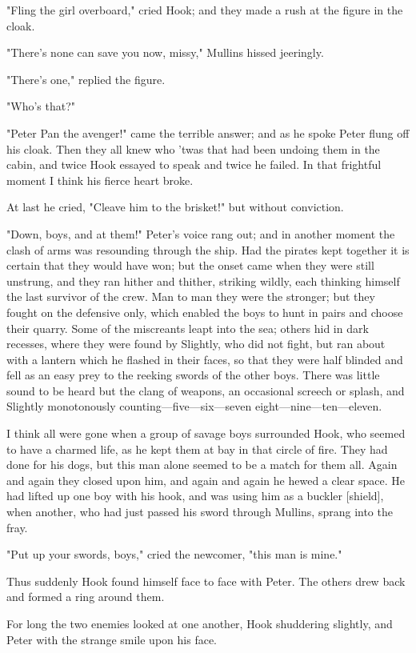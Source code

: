 "Fling the girl overboard," cried Hook; and they made a rush at the figure
in the cloak.


"There's none can save you now, missy," Mullins hissed jeeringly.


"There's one," replied the figure.


"Who's that?"


"Peter Pan the avenger!" came the terrible answer; and as he spoke Peter
flung off his cloak. Then they all knew who 'twas that had been undoing
them in the cabin, and twice Hook essayed to speak and twice he failed. In
that frightful moment I think his fierce heart broke.


At last he cried, "Cleave him to the brisket!" but without conviction.


"Down, boys, and at them!" Peter's voice rang out; and in another moment
the clash of arms was resounding through the ship. Had the pirates kept
together it is certain that they would have won; but the onset came when
they were still unstrung, and they ran hither and thither, striking
wildly, each thinking himself the last survivor of the crew. Man to man
they were the stronger; but they fought on the defensive only, which
enabled the boys to hunt in pairs and choose their quarry. Some of the
miscreants leapt into the sea; others hid in dark recesses, where they
were found by Slightly, who did not fight, but ran about with a lantern
which he flashed in their faces, so that they were half blinded and fell
as an easy prey to the reeking swords of the other boys. There was little
sound to be heard but the clang of weapons, an occasional screech or
splash, and Slightly monotonously counting—five—six—seven
eight—nine—ten—eleven.


I think all were gone when a group of savage boys surrounded Hook, who
seemed to have a charmed life, as he kept them at bay in that circle of
fire. They had done for his dogs, but this man alone seemed to be a match
for them all. Again and again they closed upon him, and again and again he
hewed a clear space. He had lifted up one boy with his hook, and was using
him as a buckler [shield], when another, who had just passed his sword
through Mullins, sprang into the fray.


"Put up your swords, boys," cried the newcomer, "this man is mine."


Thus suddenly Hook found himself face to face with Peter. The others drew
back and formed a ring around them.


For long the two enemies looked at one another, Hook shuddering slightly,
and Peter with the strange smile upon his face.


